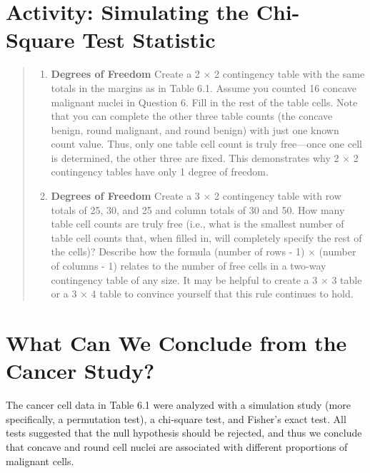 \documentclass[
]{report}
\providecommand{\tightlist}{%
  \setlength{\itemsep}{0pt}\setlength{\parskip}{0pt}}
\begin{document}
\section*{Activity: Simulating the Chi-Square Test Statistic}\label{activity-simulating-the-chi-square-test-statistic}

\begin{quote}
\begin{enumerate}
\def\labelenumi{\arabic{enumi}.}
\setcounter{enumi}{19}
\tightlist
\item
  \textbf{Degrees of Freedom} Create a 2 × 2 contingency table with the same totals in the margins as in Table 6.1. Assume you counted 16 concave malignant nuclei in Question 6. Fill in the rest of the table cells. Note that you can complete the other three table counts (the concave benign, round malignant, and round benign) with just one known count value. Thus, only one table cell count is truly free---once one cell is determined, the other three are fixed. This demonstrates why 2 × 2 contingency tables have only 1 degree of freedom.\\
\item
  \textbf{Degrees of Freedom} Create a 3 × 2 contingency table with row totals of 25, 30, and 25 and column totals of 30 and 50. How many table cell counts are truly free (i.e., what is the smallest number of table cell counts that, when filled in, will completely specify the rest of the cells)? Describe how the formula (number of rows - 1) × (number of columns - 1) relates to the number of free cells in a two-way contingency table of any size. It may be helpful to create a 3 × 3 table or a 3 × 4 table to convince yourself that this rule continues to hold.
\end{enumerate}
\end{quote}

\section{\texorpdfstring{\textbf{What Can We Conclude from the Cancer Study?}}{What Can We Conclude from the Cancer Study?}}\label{what-can-we-conclude-from-the-cancer-study}

The cancer cell data in Table 6.1 were analyzed with a simulation study (more specifically, a permutation test), a chi-square test, and Fisher's exact test. All tests suggested that the null hypothesis should be rejected, and thus we conclude that concave and round cell nuclei are associated with different proportions of malignant cells.
\end{document}
